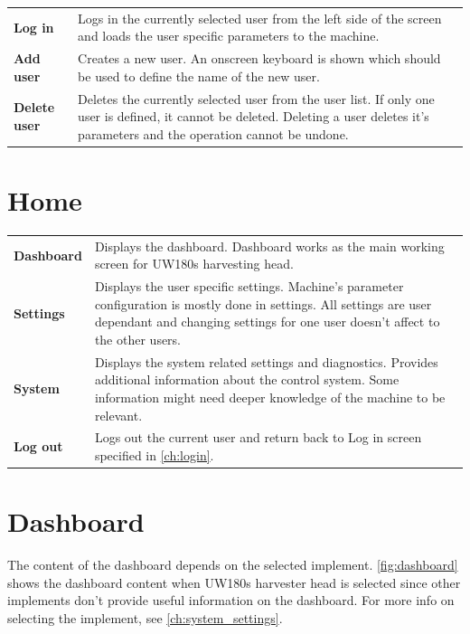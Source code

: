 \documentclass[12pt,a4paper,english]{uvmanual}
\begin{document}

\begin{tabular}{ L{0.2\textwidth} L{0.66\textwidth} }
\textbf{Log in} & Logs in the currently selected user from the left side of the screen and loads the user specific parameters to the machine. \\
\textbf{Add user} & Creates a new user. An onscreen keyboard is shown which should be used to define the name of the new user. \\
\textbf{Delete user} & Deletes the currently selected user from the user list. If only one user is defined, it cannot be deleted. Deleting a user deletes it's parameters and the operation cannot be undone. \\
\end{tabular}


\chapter{Home}\label{ch:home}


\begin{tabular}{ L{0.2\textwidth} L{0.66\textwidth} }
\textbf{Dashboard} & Displays the dashboard. Dashboard works as the main working screen for UW180s harvesting head. \\
\textbf{Settings} & Displays the user specific settings. Machine's parameter configuration is mostly done in settings. All settings are user dependant and changing settings for one user doesn't affect to the other users. \\
\textbf{System} & Displays the system related settings and diagnostics. Provides additional information about the control system. Some information might need deeper knowledge of the machine to be relevant. \\
\textbf{Log out} & Logs out the current user and return back to Log in screen specified in \autoref{ch:login}. \\
\end{tabular}



\chapter{Dashboard}\label{ch:dashboard}

The content of the dashboard depends on the selected implement. \autoref{fig:dashboard} shows the dashboard content when UW180s harvester head is selected since other implements don't provide useful information on the dashboard. For more info on selecting the implement, see \autoref{ch:system_settings}.
\end{document}
